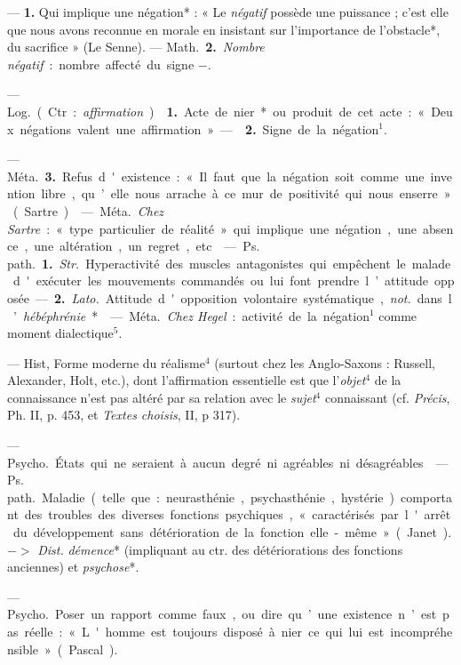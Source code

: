 \begin{itemize}[leftmargin=1cm, label=, itemsep=1pt]
 — {\bf 1.} Qui implique une négation* : « Le {\it négatif}
possède une puissance ; c’est elle que nous avons reconnue en morale en
insistant sur l'importance de l’obstacle*, du sacrifice » (Le Senne). —
\si{Math.} {\bf 2.} {\it Nombre négatif} : nombre affecté du signe $-$.

 — \si{Log.} (Ctr. : {\it affirmation}). 
{\bf 1.} Acte de nier* ou produit de cet acte : « Deux négations valent une
affirmation » —  {\bf 2.} Signe de la négation$^1$.

— \si{Méta.} {\bf 3.} Refus d'existence : « Il faut que la négation soit comme
une invention libre, qu’elle nous arrache à ce mur de positivité qui nous
enserre » (Sartre).

 — \si{Méta.} {\it Chez Sartre} : « type particulier de réalité
» qui implique une négation, une absence, une altération, un regret, etc.

 — \si{Ps. path.} {\bf 1.} {\it Str.} Hyperactivité des
muscles antagonistes qui empêchent le malade d'exécuter les mouvements
commandés ou lui font prendre l’attitude opposée. — {\bf 2.} {\it Lato.}
Attitude d'opposition volontaire systématique, {\it not.} dans
l’{\it hébéphrénie}*.

 — \si{Méta.} {\it Chez Hegel} : activité de la négation$^1$
comme moment dialectique$^5$.

 — Hist,  Forme moderne du réalisme$^4$
(surtout chez les Anglo-Saxons : Russell, Alexander, Holt, etc.), dont
l'affirmation essentielle est que l'{\it objet}$^4$ de la connaissance n’est
pas altéré par sa relation avec le {\it sujet}$^4$ connaissant (cf.
{\it Précis}, Ph. II, p. 453, et {\it Textes choisis}, II, p 317).

 — \si{Psycho.} États qui
ne seraient à aucun degré ni agréables ni désagréables.

 — \si{Ps. path.} Maladie (telle que : neurasthénie,
psychasthénie, hystérie) comportant des troubles des diverses fonctions
psychiques, « caractérisés par l'arrêt du développement sans détérioration de
la fonction elle-même » (Janet). $->$ {\it Dist.} {\it démence}* (impliquant
au ctr. des détériorations des fonctions anciennes) et {\it psychose}*.

 — \si{Psycho.} Poser un rapport comme faux, ou dire qu’une
existence n’est pas réelle : « L'homme est toujours disposé à nier ce qui lui
est incompréhensible » (Pascal).


\end{itemize}
